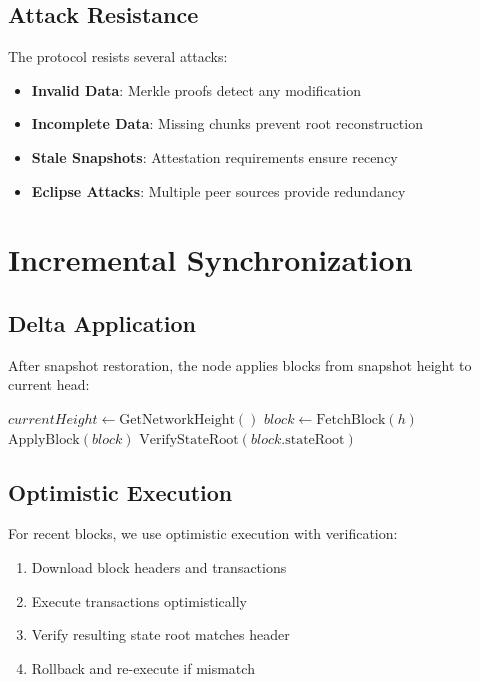 \documentclass[11pt,a4paper]{article}
\begin{document}
\subsection{Attack Resistance}

The protocol resists several attacks:

\begin{itemize}
    \item \textbf{Invalid Data}: Merkle proofs detect any modification
    \item \textbf{Incomplete Data}: Missing chunks prevent root reconstruction
    \item \textbf{Stale Snapshots}: Attestation requirements ensure recency
    \item \textbf{Eclipse Attacks}: Multiple peer sources provide redundancy
\end{itemize}

\section{Incremental Synchronization}

\subsection{Delta Application}

After snapshot restoration, the node applies blocks from snapshot height to current head:

\begin{algorithm}
\caption{Incremental Sync}
\begin{algorithmic}[1]
    \State $currentHeight \gets \text{GetNetworkHeight}()$
        \State $block \gets \text{FetchBlock}(h)$
        \State $\text{ApplyBlock}(block)$
        \State $\text{VerifyStateRoot}(block.\text{stateRoot})$
    \EndFor
\EndProcedure
\end{algorithmic}
\end{algorithm}

\subsection{Optimistic Execution}

For recent blocks, we use optimistic execution with verification:

\begin{enumerate}
    \item Download block headers and transactions
    \item Execute transactions optimistically
    \item Verify resulting state root matches header
    \item Rollback and re-execute if mismatch
\end{enumerate}
\end{document}

